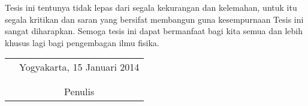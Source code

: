\documentclass{jtetiskripsi}
\begin{document}
Tesis ini tentunya tidak lepas dari segala kekurangan dan kelemahan, untuk itu
segala kritikan dan saran yang bersifat membangun guna kesempurnaan Tesis ini
sangat diharapkan. Semoga tesis ini dapat bermanfaat bagi kita semua dan lebih
khusus lagi bagi pengembagan ilmu fisika.

\begin{tabular}{p{7.5cm}c}
&Yogyakarta, 15 Januari 2014\\
&\\
&\\
&Penulis
\end{tabular}

\tableofcontents
{}
\listoftables
{}
\listoffigures
{}
\end{document}
